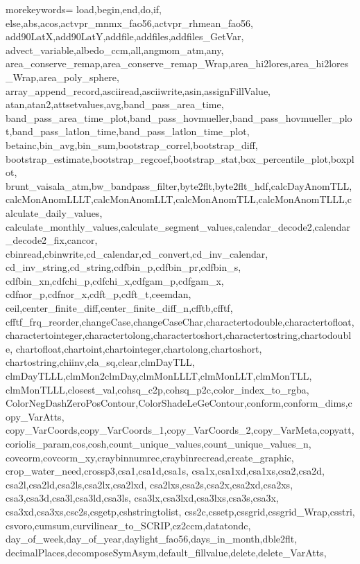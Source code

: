 
{morekeywords={
	load,begin,end,do,if,
	else,abs,acos,actvpr_mnmx_fao56,actvpr_rhmean_fao56,
	add90LatX,add90LatY,addfile,addfiles,addfiles_GetVar,
	advect_variable,albedo_ccm,all,angmom_atm,any,
	area_conserve_remap,area_conserve_remap_Wrap,area_hi2lores,area_hi2lores_Wrap,area_poly_sphere,
	array_append_record,asciiread,asciiwrite,asin,assignFillValue,
	atan,atan2,attsetvalues,avg,band_pass_area_time,
	band_pass_area_time_plot,band_pass_hovmueller,band_pass_hovmueller_plot,band_pass_latlon_time,band_pass_latlon_time_plot,
	betainc,bin_avg,bin_sum,bootstrap_correl,bootstrap_diff,
	bootstrap_estimate,bootstrap_regcoef,bootstrap_stat,box_percentile_plot,boxplot,
	brunt_vaisala_atm,bw_bandpass_filter,byte2flt,byte2flt_hdf,calcDayAnomTLL,
	calcMonAnomLLLT,calcMonAnomLLT,calcMonAnomTLL,calcMonAnomTLLL,calculate_daily_values,
	calculate_monthly_values,calculate_segment_values,calendar_decode2,calendar_decode2_fix,cancor,
	cbinread,cbinwrite,cd_calendar,cd_convert,cd_inv_calendar,
	cd_inv_string,cd_string,cdfbin_p,cdfbin_pr,cdfbin_s,
	cdfbin_xn,cdfchi_p,cdfchi_x,cdfgam_p,cdfgam_x,
	cdfnor_p,cdfnor_x,cdft_p,cdft_t,ceemdan,
	ceil,center_finite_diff,center_finite_diff_n,cfftb,cfftf,
	cfftf_frq_reorder,changeCase,changeCaseChar,charactertodouble,charactertofloat,
	charactertointeger,charactertolong,charactertoshort,charactertostring,chartodouble,
	chartofloat,chartoint,chartointeger,chartolong,chartoshort,
	chartostring,chiinv,cla_sq,clear,clmDayTLL,
	clmDayTLLL,clmMon2clmDay,clmMonLLLT,clmMonLLT,clmMonTLL,
	clmMonTLLL,closest_val,cohsq_c2p,cohsq_p2c,color_index_to_rgba,
	ColorNegDashZeroPosContour,ColorShadeLeGeContour,conform,conform_dims,copy_VarAtts,
	copy_VarCoords,copy_VarCoords_1,copy_VarCoords_2,copy_VarMeta,copyatt,
	coriolis_param,cos,cosh,count_unique_values,count_unique_values_n,
	covcorm,covcorm_xy,craybinnumrec,craybinrecread,create_graphic,
	crop_water_need,crossp3,csa1,csa1d,csa1s,
	csa1x,csa1xd,csa1xs,csa2,csa2d,
	csa2l,csa2ld,csa2ls,csa2lx,csa2lxd,
	csa2lxs,csa2s,csa2x,csa2xd,csa2xs,
	csa3,csa3d,csa3l,csa3ld,csa3ls,
	csa3lx,csa3lxd,csa3lxs,csa3s,csa3x,
	csa3xd,csa3xs,csc2s,csgetp,cshstringtolist,
	css2c,cssetp,cssgrid,cssgrid_Wrap,csstri,
	csvoro,cumsum,curvilinear_to_SCRIP,cz2ccm,datatondc,
	day_of_week,day_of_year,daylight_fao56,days_in_month,dble2flt,
	decimalPlaces,decomposeSymAsym,default_fillvalue,delete,delete_VarAtts,
}}
